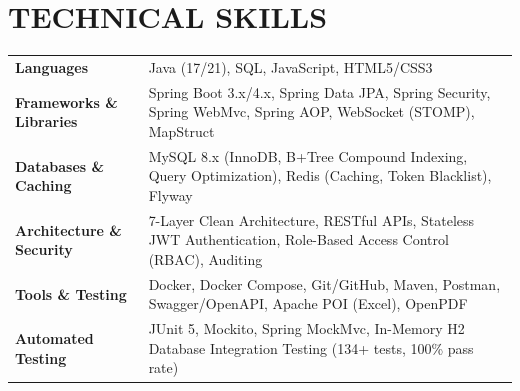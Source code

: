 ﻿\documentclass[10pt,a4paper]{article}
\begin{document}
\section*{TECHNICAL SKILLS}
\begin{tabularx}{\textwidth}{@{}l X@{}}
\textbf{Languages} & Java (17/21), SQL, JavaScript, HTML5/CSS3 \\
\textbf{Frameworks \& Libraries} & Spring Boot 3.x/4.x, Spring Data JPA, Spring Security, Spring WebMvc, Spring AOP, WebSocket (STOMP), MapStruct \\
\textbf{Databases \& Caching} & MySQL 8.x (InnoDB, B+Tree Compound Indexing, Query Optimization), Redis (Caching, Token Blacklist), Flyway \\
\textbf{Architecture \& Security}& 7-Layer Clean Architecture, RESTful APIs, Stateless JWT Authentication, Role-Based Access Control (RBAC), Auditing \\
\textbf{Tools \& Testing} & Docker, Docker Compose, Git/GitHub, Maven, Postman, Swagger/OpenAPI, Apache POI (Excel), OpenPDF \\
\textbf{Automated Testing} & JUnit 5, Mockito, Spring MockMvc, In-Memory H2 Database Integration Testing (134+ tests, 100\% pass rate) \\
\end{tabularx}

\end{document}
